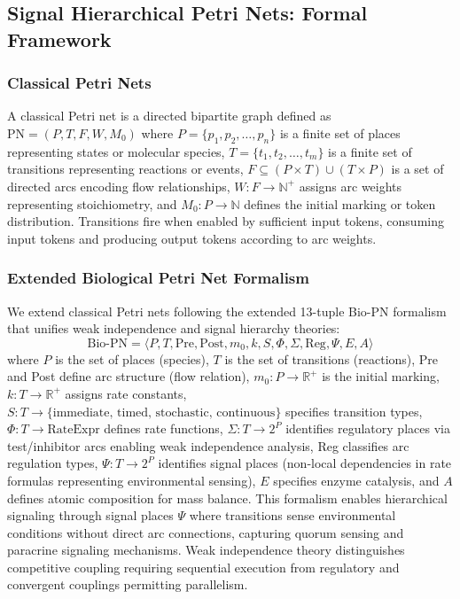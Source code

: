 \documentclass[twocolumn,11pt]{article}
\begin{document}
\subsection{Signal Hierarchical Petri Nets: Formal Framework}

\subsubsection{Classical Petri Nets}

A classical Petri net is a directed bipartite graph defined as $\text{PN} = (P, T, F, W, M_0)$ where $P = \{p_1, p_2, \ldots, p_n\}$ is a finite set of places representing states or molecular species, $T = \{t_1, t_2, \ldots, t_m\}$ is a finite set of transitions representing reactions or events, $F \subseteq (P \times T) \cup (T \times P)$ is a set of directed arcs encoding flow relationships, $W: F \to \mathbb{N}^+$ assigns arc weights representing stoichiometry, and $M_0: P \to \mathbb{N}$ defines the initial marking or token distribution. Transitions fire when enabled by sufficient input tokens, consuming input tokens and producing output tokens according to arc weights.

\subsubsection{Extended Biological Petri Net Formalism}

We extend classical Petri nets following the extended 13-tuple Bio-PN formalism \citep{simao2025unified} that unifies weak independence and signal hierarchy theories:
\begin{equation}
\text{Bio-PN} = \langle P, T, \text{Pre}, \text{Post}, m_0, k, S, \Phi, \Sigma, \text{Reg}, \Psi, E, A \rangle
\end{equation}
where $P$ is the set of places (species), $T$ is the set of transitions (reactions), Pre and Post define arc structure (flow relation), $m_0: P \to \mathbb{R}^+$ is the initial marking, $k: T \to \mathbb{R}^+$ assigns rate constants, $S: T \to \{\text{immediate, timed, stochastic, continuous}\}$ specifies transition types, $\Phi: T \to \text{RateExpr}$ defines rate functions, $\Sigma: T \to 2^P$ identifies regulatory places via test/inhibitor arcs enabling weak independence analysis, Reg classifies arc regulation types, $\Psi: T \to 2^P$ identifies signal places (non-local dependencies in rate formulas representing environmental sensing), $E$ specifies enzyme catalysis, and $A$ defines atomic composition for mass balance. This formalism enables hierarchical signaling through signal places $\Psi$ where transitions sense environmental conditions without direct arc connections, capturing quorum sensing and paracrine signaling mechanisms. Weak independence theory \citep{simao2025weak} distinguishes competitive coupling requiring sequential execution from regulatory and convergent couplings permitting parallelism.
\end{document}
